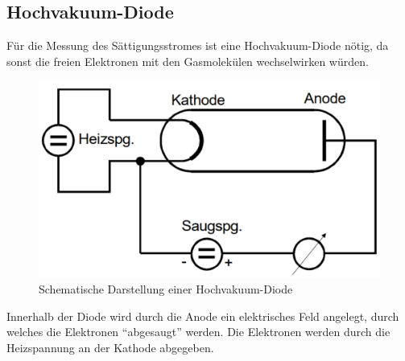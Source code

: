 \subsection{Hochvakuum-Diode}
Für die Messung des Sättigungsstromes ist eine Hochvakuum-Diode nötig, da sonst die freien Elektronen mit den Gasmolekülen wechselwirken würden.
\begin{figure} [H]
    \center
    \caption{Schematische Darstellung einer Hochvakuum-Diode}\label{fig:Diode}
    \includegraphics[width=0.5\linewidth]{pictures/Diode.pdf}
\end{figure}
Innerhalb der Diode wird durch die Anode ein elektrisches Feld angelegt, durch welches die Elektronen \enquote{abgesaugt} werden.
Die Elektronen werden durch die Heizspannung an der Kathode abgegeben.